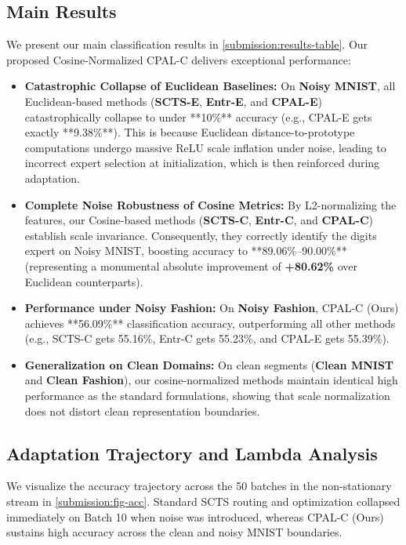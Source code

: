 \documentclass{article}
\theoremstyle{plain}
\theoremstyle{definition}
\theoremstyle{remark}
\begin{document}
\subsection{Main Results}
We present our main classification results in \cref{submission:results-table}. 
Our proposed Cosine-Normalized CPAL-C delivers exceptional performance:
\begin{itemize}
    \item \textbf{Catastrophic Collapse of Euclidean Baselines:} On \textbf{Noisy MNIST}, all Euclidean-based methods (\textbf{SCTS-E}, \textbf{Entr-E}, and \textbf{CPAL-E}) catastrophically collapse to under **10\%** accuracy (e.g., CPAL-E gets exactly **9.38\%**). This is because Euclidean distance-to-prototype computations undergo massive ReLU scale inflation under noise, leading to incorrect expert selection at initialization, which is then reinforced during adaptation.
    \item \textbf{Complete Noise Robustness of Cosine Metrics:} By L2-normalizing the features, our Cosine-based methods (\textbf{SCTS-C}, \textbf{Entr-C}, and \textbf{CPAL-C}) establish scale invariance. Consequently, they correctly identify the digits expert on Noisy MNIST, boosting accuracy to **89.06\%--90.00\%** (representing a monumental absolute improvement of \textbf{+80.62\%} over Euclidean counterparts).
    \item \textbf{Performance under Noisy Fashion:} On \textbf{Noisy Fashion}, CPAL-C (Ours) achieves **56.09\%** classification accuracy, outperforming all other methods (e.g., SCTS-C gets 55.16\%, Entr-C gets 55.23\%, and CPAL-E gets 55.39\%).
    \item \textbf{Generalization on Clean Domains:} On clean segments (\textbf{Clean MNIST} and \textbf{Clean Fashion}), our cosine-normalized methods maintain identical high performance as the standard formulations, showing that scale normalization does not distort clean representation boundaries.
\end{itemize}

\subsection{Adaptation Trajectory and Lambda Analysis}
We visualize the accuracy trajectory across the 50 batches in the non-stationary stream in \cref{submission:fig-acc}. Standard SCTS routing and optimization collapsed immediately on Batch 10 when noise was introduced, whereas CPAL-C (Ours) sustains high accuracy across the clean and noisy MNIST boundaries.
\end{document}
